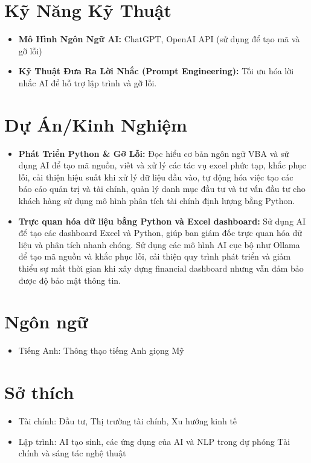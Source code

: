 \documentclass[a4paper,12pt]{article}
\begin{document}
\section{Kỹ Năng Kỹ Thuật}
\begin{itemize}[left=0pt]
    \item \textbf{Mô Hình Ngôn Ngữ AI:} ChatGPT, OpenAI API (sử dụng để tạo mã và gỡ lỗi)
    \item \textbf{Kỹ Thuật Đưa Ra Lời Nhắc (Prompt Engineering):} Tối ưu hóa lời nhắc AI để hỗ trợ lập trình và gỡ lỗi.
\end{itemize}

\section{Dự Án/Kinh Nghiệm}
\begin{itemize}[left=0pt]
    \item \textbf{Phát Triển Python \& Gỡ Lỗi:} Đọc hiểu cơ bản ngôn ngữ VBA và sử dụng AI để tạo mã nguồn, viết và xử lý các tác vụ excel phức tạp, khắc phục lỗi, cải thiện hiệu suất khi xử lý dữ liệu đầu vào, tự động hóa việc tạo các báo cáo quản trị và tài chính, quản lý danh mục đầu tư và tư vấn đầu tư cho khách hàng sử dụng mô hình phân tích tài chính định lượng bằng Python. 
    \item \textbf{Trực quan hóa dữ liệu bằng Python và Excel dashboard:} Sử dụng AI để tạo các dashboard Excel và Python, giúp ban giám đốc trực quan hóa dữ liệu và phân tích nhanh chóng. Sử dụng các mô hình AI cục bộ như Ollama để tạo mã nguồn và khắc phục lỗi, cải thiện quy trình phát triển và giảm thiểu sự mất thời gian khi xây dựng financial dashboard nhưng vẫn đảm bảo được độ bảo mật thông tin.
\end{itemize}


\section*{Ngôn ngữ}
\begin{itemize}[leftmargin=0.5cm]
    \item Tiếng Anh: Thông thạo tiếng Anh giọng Mỹ
\end{itemize}

\section*{Sở thích}
\begin{itemize}[leftmargin=0.5cm]
    \item Tài chính: Đầu tư, Thị trường tài chính, Xu hướng kinh tế
    \item Lập trình: AI tạo sinh, các ứng dụng của AI và NLP trong dự phóng Tài chính và sáng tác nghệ thuật
\end{itemize}
\end{document}
